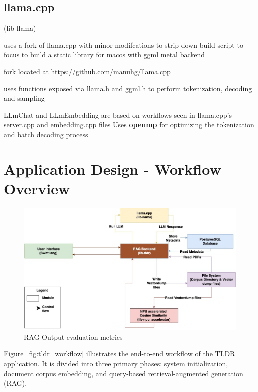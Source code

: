 \subsection{llama.cpp}
\label{subsec:AppDesignModules-LLaMaCpp}
(lib-llama)

uses a fork of llama.cpp with minor modifcations to strip down build script to focus to build a static library for macos with ggml metal backend

fork located at https://github.com/manuhg/llama.cpp

uses functions exposed via llama.h and ggml.h to perform tokenization,  decoding and sampling

LLmChat and LLmEmbedding are based on workflows seen in llama.cpp's server.cpp and embedding.cpp files Uses \textbf{openmp} for optimizing the tokenization and batch decoding process

\section{Application Design - Workflow Overview}
\label{subsec:AppDesignWorkflow-Overview}

\begin{figure}[H]
    \centering
    \includegraphics[width=1.0\linewidth]{images/tldr-app-module-interactions.jpg}
    \caption{RAG Output evaluation metrics ~\cite{cardenas2023rag}}
    \label{fig:autoregressive_decoding}
\end{figure}



Figure~\ref{fig:tldr_workflow} illustrates the end-to-end workflow of the TLDR application. It is divided into three primary phases: system initialization, document corpus embedding, and query-based retrieval-augmented generation (RAG).

